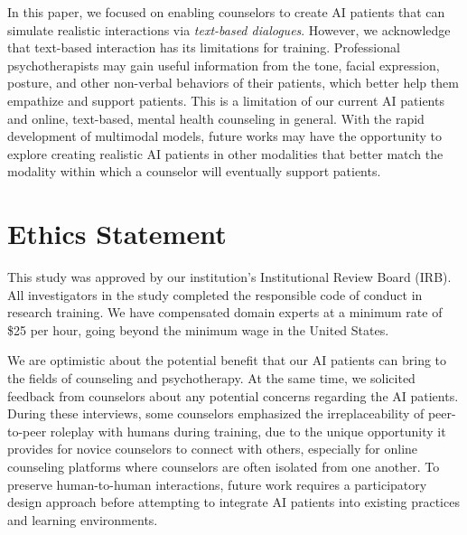 \documentclass[11pt]{article}
\begin{document}

In this paper, we focused on enabling counselors to create AI patients that can simulate realistic interactions via \textit{text-based dialogues}. However, we acknowledge that text-based interaction has its limitations for training. Professional psychotherapists may gain useful information from the tone, facial expression, posture, and other non-verbal behaviors of their patients, which better help them empathize and support patients.
This is a limitation of our current AI patients and online, text-based, mental health counseling in general. %
With the rapid development of multimodal models, future works may have the opportunity to explore creating realistic AI patients in other modalities that better match the modality within which a counselor will eventually support patients.


\section*{Ethics Statement} 

This study was approved by our institution's Institutional Review Board (IRB).
All investigators in the study completed the responsible code of conduct in research training. We have compensated domain experts at a minimum rate of \$25 per hour, going beyond the minimum wage in the United States.

We are optimistic about the potential benefit that our AI patients can bring to the fields of counseling and psychotherapy. At the same time, we solicited feedback from counselors about any potential concerns regarding the AI patients.
During these interviews, some counselors emphasized the irreplaceability of peer-to-peer roleplay with humans during training, due to the unique opportunity it provides for novice counselors to connect with others, especially for online counseling platforms where counselors are often isolated from one another.
To preserve human-to-human interactions, future work requires a participatory design approach before attempting to integrate AI patients into existing practices and learning environments.
\end{document}
